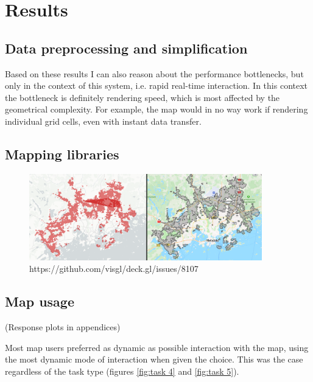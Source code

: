 \section{Results}

\subsection{Data preprocessing and simplification}



Based on these results
I can also reason about the performance bottlenecks,
but only in the context of this system, i.e. rapid real-time interaction.
In this context the bottleneck is definitely rendering speed,
which is most affected by the geometrical complexity.
For example, the map would in no way work if rendering individual grid cells,
even with instant data transfer.

\subsection{Mapping libraries}



\begin{figure}[H]
	\centering
	\includegraphics[width=0.9\textwidth]{visual/figures/screenshots/bug.png}
	\caption{https://github.com/visgl/deck.gl/issues/8107}
	\label{fig:bug}
\end{figure}

\subsection{Map usage}

(Response plots in appendices)

Most map users preferred as dynamic as possible interaction with the map,
using the most dynamic mode of interaction when given the choice.
This was the case regardless of the task type (figures \ref{fig:task 4} and \ref{fig:task 5}).

